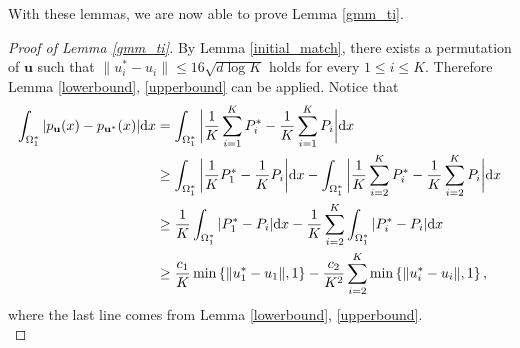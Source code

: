 With these lemmas, we are now able to prove Lemma \ref{gmm_ti}.
\begin{proof}[Proof of Lemma \ref{gmm_ti}]
By Lemma \ref{initial_match}, there exists a permutation of $\boldsymbol{u}$ such that $\|u_{i}^{*}-u_{i}\| \leq 16\sqrt{d\log{K}}$ holds for every $1\leq i \leq K$. Therefore Lemma \ref{lowerbound}, \ref{upperbound} can be applied. Notice that
\begin{align}
\int_{\Omega_{1}^{*}} |p_{\mathbf{u}}(x)- p_{\mathbf{u}^* }(x)| \mathrm{d}x 
&= \int_{\Omega_{1}^{*}} \bigg|\frac{1}{K}\sum_{i=1}^{K} P_{i}^{*}- \frac{1}{K}\sum_{i=1}^{K} P_{i}  \bigg| \mathrm{d}x \notag \\
& \geq \int_{\Omega_{1}^{*}} \bigg|\frac{1}{K} P_{1}^{*}- \frac{1}{K} P_{i}  \bigg| \mathrm{d}x -\int_{\Omega_{1}^{*}} \bigg|\frac{1}{K}\sum_{i=2}^{K} P_{i}^{*}- \frac{1}{K}\sum_{i=2}^{K} P_{i}  \bigg| \mathrm{d}x \notag \\
& \geq \frac{1}{K} \int_{\Omega_{1}^{*}} | P_{1}^{*}-  P_{i}  | \mathrm{d}x -\frac{1}{K}\sum_{i=2}^{K} \int_{\Omega_{1}^{*}} | P_{i}^{*}- P_{i}  | \mathrm{d}x \notag\\
& \geq \frac{c_{1}}{K} \min \left\{ \|u_{1}^{*}-u_{1}\|, 1 \right\} - \frac{c_{2}}{K^{2}} \sum_{i=2}^{K} \min \left\{ \|u_{i}^{*}-u_{i}\|, 1 \right\},
\end{align}
where the last line comes from Lemma \ref{lowerbound}, \ref{upperbound}. \\


\end{proof}
